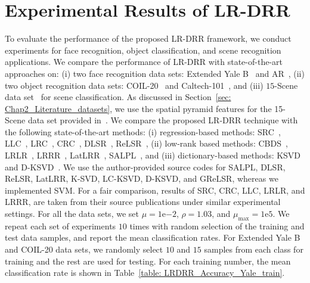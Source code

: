 \section{Experimental Results of LR-DRR}
\label{sec: Chap6_LRDRR_result}
%
To evaluate the performance of the proposed LR-DRR framework, we conduct experiments for face recognition, object classification, and scene recognition applications. We compare the performance of LR-DRR with state-of-the-art approaches on: (i) two face recognition data sets: Extended Yale B~\cite{Yale_B} and AR~\cite{Data_AR}, (ii) two object recognition data sets: COIL-20~\cite{Data_COIL} and Caltech-101~\cite{Caltech101}, and (iii) $15$-Scene data set~\cite{15scene_1} for scene classification. As discussed in Section~\ref{sec: Chap2_Literature_datasets}, we use the spatial pyramid features for the 15-Scene data set provided in~\cite{LCKSVD, 15scene_3}. 
We compare the proposed LR-DRR technique with the following state-of-the-art methods: (i) regression-based methods: SRC~\cite{SRC}, LLC~\cite{LLC}, LRC~\cite{LRC}, CRC~\cite{CRC}, DLSR~\cite{DLSR}, ReLSR~\cite{ReLSR}, (ii) low-rank based methods: CBDS~\cite{CBDS}, LRLR~\cite{LRLR_SLRR}, LRRR~\cite{LRLR_SLRR}, LatLRR~\cite{LatLRR}, SALPL~\cite{SALPL}, and (iii) dictionary-based methods: KSVD~\cite{KSVD} and D-KSVD~\cite{DKSVD}. We use the author-provided source codes for SALPL, DLSR, ReLSR, LatLRR, K-SVD, LC-KSVD, D-KSVD, and GReLSR, whereas we implemented SVM. For a fair comparison, results of SRC, CRC, LLC, LRLR, and LRRR, are taken from their source publications under similar experimental settings. For all the data sets, we set $\mu = 1\mathrm{e}{-2}$, $\rho = 1.03$, and $\mu_{\text{max}} = 1\mathrm{e}{5}$. We repeat each set of experiments $10$ times with random selection of the training and test data samples, and report the mean classification rates. For Extended Yale B and COIL-20 data sets, we randomly select $10$ and $15$ samples from each class for training and the rest are used for testing. For each training number, the mean classification rate is shown in Table~\ref{table: LRDRR_Accuracy_Yale_train}.  
